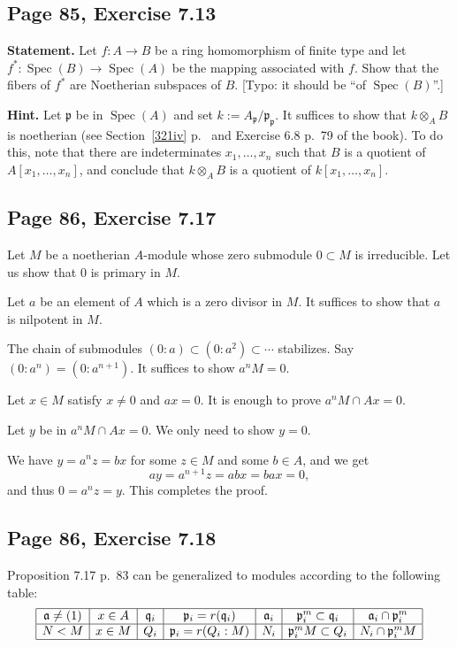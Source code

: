 \documentclass[parskip=half,fontsize=12pt]{scrartcl}%
\newcommand{\mf}{\mathfrak}
\newcommand{\aaa}{\mf a}
\newcommand{\ppp}{\mf p}
\newcommand{\qqq}{\mf q}
\newcommand{\Spec}{\operatorname{Spec}}\newcommand{\Sp}{\operatorname{Spec}}
\begin{document}
\subsection{Page 85, Exercise 7.13}%

\textbf{Statement.} Let $f:A\to B$ be a ring homomorphism of finite type and let $f^*: \Spec(B)\to\Spec(A)$ be the mapping associated with $f$. Show that the fibers of $f^*$ are Noetherian subspaces of $B$. [Typo: it should be ``of $\Spec(B)$''.]

\textbf{Hint.} Let $\ppp$ be in $\Spec(A)$ and set $k:=A_\ppp/\ppp_\ppp$. It suffices to show that $k\otimes_AB$ is noetherian (see Section~\ref{321iv} p.~\pageref{321iv} and Exercise 6.8 p.~79 of the book). To do this, note that there are indeterminates $x_1,\dots,x_n$ such that $B$ is a quotient of $A[x_1,\dots,x_n]$, and conclude that $k\otimes_AB$ is a quotient of $k[x_1,\dots,x_n]$. 

\subsection{Page 86, Exercise 7.17}%

Let $M$ be a noetherian $A$-module whose zero submodule $0\subset M$ is irreducible. Let us show that $0$ is primary in $M$. 

Let $a$ be an element of $A$ which is a zero divisor in $M$. It suffices to show that $a$ is nilpotent in $M$. 

The chain of submodules $(0:a)\subset(0:a^2)\subset\cdots$ stabilizes. Say $(0:a^n)=(0:a^{n+1})$. It suffices to show $a^nM=0$. 

Let $x\in M$ satisfy $x\ne0$ and $ax=0$. It is enough to prove $a^nM\cap Ax=0$. 

Let $y$ be in $a^nM\cap Ax=0$. We only need to show $y=0$. 

We have $y=a^nz=bx$ for some $z\in M$ and some $b\in A$, and we get 
$$
ay=a^{n+1}z=abx=bax=0,
$$ 
and thus $0=a^nz=y$. This completes the proof.%

\subsection{Page 86, Exercise 7.18}%

Proposition 7.17 p.~83 can be generalized to modules according to the following table: 
$$
\begin{array}{|c|c|c|c|c|c|c|}\hline
\aaa\ne(1)&x\in A&\qqq_i&\ppp_i=r(\qqq_i)&\aaa_i&\ppp_i^m\subset\qqq_i&\aaa_i\cap\ppp_i^m\\ \hline
N<M&x\in M&Q_i&\ppp_i=r(Q_i:M)&N_i&\ppp_i^mM\subset Q_i&N_i\cap\ppp_i^mM\\ \hline
\end{array}
$$ 
\end{document}
